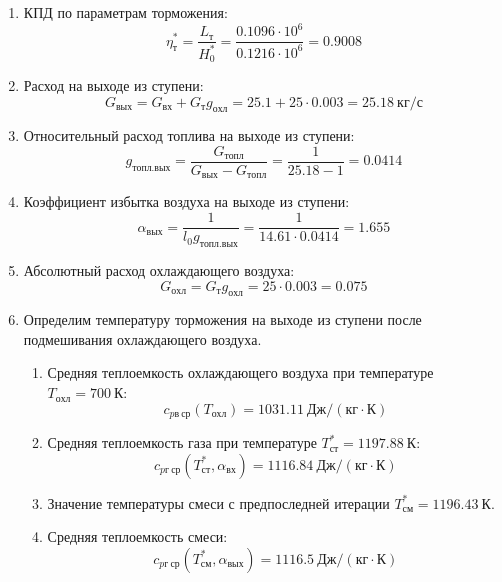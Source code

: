 \documentclass[a4paper,10pt]{article}
\begin{document}
\begin{enumerate}
        \item КПД по параметрам торможения:
        \[
            \eta_т^* = \frac{ L_т }{ H_0^* } =
                \frac{
                    0.1096 \cdot 10^6
                }{
                    0.1216 \cdot 10^6 } =
            0.9008
        \]

        \item Расход на выходе из ступени:
        \[
            G_{вых} = G_{вх} + G_т g_{охл} =
                25.1 + 25 \cdot
                0.003 =
            25.18 \ кг/с
        \]

        \item Относительный расход топлива на выходе из ступени:
        \[
            g_{топл.вых} = \frac{ G_{топл} }{ G_{вых} - G_{топл} } =
                 \frac{ 1 }{ 25.18 - 1 } =
            0.0414
        \]

        \item Коэффициент избытка воздуха на выходе из ступени:
        \[
            \alpha_{вых} = \frac{ 1 }{ l_0 g_{топл.вых} } =
                \frac{ 1 }{ 14.61 \cdot 0.0414 } =
            1.655
        \]

        \item Абсолютный расход охлаждающего воздуха:
        \[
            G_{охл} = G_т g_{охл} = 25 \cdot 0.003 =
            0.075
        \]

        \item Определим температуру торможения на выходе из ступени после подмешивания охлаждающего воздуха.
        \begin{enumerate}

            \item Средняя теплоемкость охлаждающего воздуха при температуре $T_{охл} = 700\ К $:
            \[
                c_{pв\ ср} (T_{охл}) = 1031.11\ Дж/ (кг \cdot К)
            \]

            \item Средняя теплоемкость газа при температуре $T_{ст}^* = 1197.88 \ К $:
            \[
                c_{pг\ ср} (T_{ст}^*, \alpha_{вх}) =
                1116.84\ Дж/ (кг \cdot К)
            \]

            \item Значение температуры смеси с предпоследней итерации $T_{см}^{*} = 1196.43\ К$.

            \item Средняя теплоемкость смеси:
            \[
                c_{pг\ ср} (T_{см}^{*}, \alpha_{вых}) =
                1116.5\ Дж/ (кг \cdot К)
            \]


\end{enumerate}
\end{enumerate}
\end{document}
